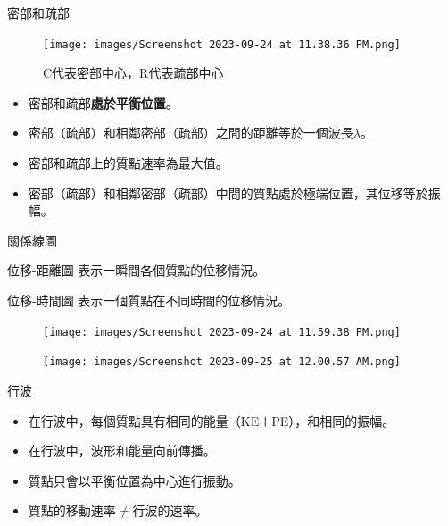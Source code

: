 \documentclass[13pt]{beamer}
\begin{document}
\begin{frame}{密部和疏部}
    \begin{figure}
        \centering
        \texttt{[image: images/Screenshot 2023-09-24 at 11.38.36 PM.png]}
        \caption{C代表密部中心，R代表疏部中心}

    \end{figure}
    \begin{itemize}
        \item 密部和疏部\textbf{處於平衡位置}。
        \item 密部（疏部）和相鄰密部（疏部）之間的距離等於一個波長$\lambda$。
        \item 密部和疏部上的質點速率為最大值。
        \item 密部（疏部）和相鄰密部（疏部）中間的質點處於極端位置，其位移等於振幅。
    \end{itemize}
\end{frame}

\begin{frame}{關係線圖}
    \begin{block}{位移-距離圖}
        表示一瞬間各個質點的位移情況。
    \end{block}\bigskip
    \begin{block}{位移-時間圖}
        表示一個質點在不同時間的位移情況。
    \end{block}


\end{frame}

\begin{frame}{}
    \begin{figure}
        \centering
        \texttt{[image: images/Screenshot 2023-09-24 at 11.59.38 PM.png]}


    \end{figure}
    \begin{figure}
        \centering
        \texttt{[image: images/Screenshot 2023-09-25 at 12.00.57 AM.png]}


    \end{figure}
\end{frame}

\begin{frame}{行波}
    \begin{itemize}
        \item 在行波中，每個質點具有相同的能量（KE＋PE），和相同的振幅。
        \item 在行波中，波形和能量向前傳播。
        \item 質點只會以平衡位置為中心進行振動。
        \item 質點的移動速率$\neq$行波的速率。
    \end{itemize}
\end{frame}
\end{document}
